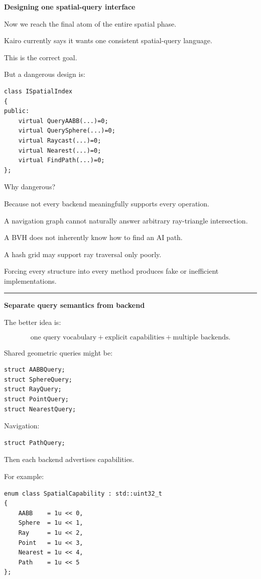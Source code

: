 \textbf{Designing one spatial-query interface}

Now we reach the final atom of the entire spatial phase.

Kairo currently says it wants one consistent spatial-query language.

This is the correct goal.

But a dangerous design is:

\begin{verbatim}
class ISpatialIndex
{
public:
    virtual QueryAABB(...)=0;
    virtual QuerySphere(...)=0;
    virtual Raycast(...)=0;
    virtual Nearest(...)=0;
    virtual FindPath(...)=0;
};
\end{verbatim}

Why dangerous?

Because not every backend meaningfully supports every operation.

A navigation graph cannot naturally answer arbitrary ray-triangle intersection.

A BVH does not inherently know how to find an AI path.

A hash grid may support ray traversal only poorly.

Forcing every structure into every method produces fake or inefficient implementations.

\begin{center}\rule{0.5\linewidth}{0.5pt}\end{center}

\textbf{Separate query semantics from backend}

The better idea is:

\[
\boxed{
\text{one query vocabulary}
+
\text{explicit capabilities}
+
\text{multiple backends}.
}
\]

Shared geometric queries might be:

\begin{verbatim}
struct AABBQuery;
struct SphereQuery;
struct RayQuery;
struct PointQuery;
struct NearestQuery;
\end{verbatim}

Navigation:

\begin{verbatim}
struct PathQuery;
\end{verbatim}

Then each backend advertises capabilities.

For example:

\begin{verbatim}
enum class SpatialCapability : std::uint32_t
{
    AABB    = 1u << 0,
    Sphere  = 1u << 1,
    Ray     = 1u << 2,
    Point   = 1u << 3,
    Nearest = 1u << 4,
    Path    = 1u << 5
};
\end{verbatim}

